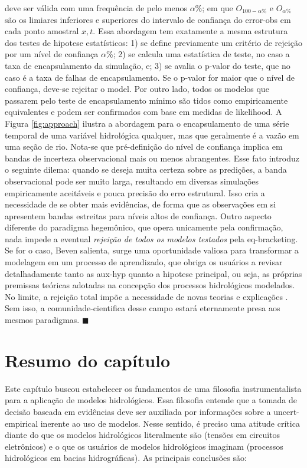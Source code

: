 \documentclass[./main.tex]{subfiles}
\begin{document}
deve ser válida com uma frequência de pelo menos $\alpha\%$; em que $O_{100-\alpha\%}$ e  $O_{\alpha\%}$ são os limiares inferiores e superiores do intervalo de confiança do \gls{error-obs} em cada ponto amostral $x, t$. Essa abordagem tem exatamente a mesma estrutura dos testes de \gls{hipotese} estatísticos: 1) se define previamente um critério de rejeição por um nível de confiança $\alpha$\%; 2) se calcula uma estatística de teste, no caso a taxa de encapsulamento da simulação, e; 3) se avalia o p-valor do teste, que no caso é a taxa de falhas de encapsulamento. Se o p-valor for maior que o nível de confiança, deve-se rejeitar o \gls{model}. Por outro lado, todos os modelos que passarem pelo teste de encapsulamento mínimo são tidos como empiricamente equivalentes e podem ser confirmados com base em medidas de \gls{likelihood}. A Figura \ref{fig:approach} ilustra a abordagem para o encapsulamento de uma série temporal de uma variável hidrológica qualquer, mas que geralmente é a vazão em uma seção de rio. Nota-se que pré-definição do nível de confiança implica em bandas de incerteza observacional mais ou menos abrangentes. Esse fato introduz o seguinte dilema: quando se deseja muita certeza sobre as predições, a banda observacional pode ser muito larga, resultando em diversas simulações empiricamente aceitáveis e pouca precisão do erro estrutural. Isso cria a necessidade de se obter mais evidências, de forma que as observações em si apresentem bandas estreitas para níveis altos de confiança. Outro aspecto diferente do \gls{paradigma} hegemônico, que opera unicamente pela confirmação, nada impede a eventual \textit{rejeição de todos os modelos testados} pela \gls{eq-bracketing}. Se for o caso, Beven salienta, surge uma oportunidade valiosa para transformar a modelagem em um processo de aprendizado, que obriga os usuários a revisar detalhadamente tanto as \gls{aux-hyp} quanto a \gls{hipotese} principal, ou seja, as próprias premissas teóricas adotadas na concepção dos processos hidrológicos modelados. No limite, a rejeição total impõe a necessidade de novas teorias e explicações \cite{Beven2018}. Sem isso, a \gls{comunidade-cientifica} desse campo estará eternamente presa aos mesmos paradigmas. $\blacksquare$

\clearpage

\section{Resumo do capítulo} \label{sec:epis:summary}

\par Este capítulo buscou estabelecer os fundamentos de uma filosofia instrumentalista para a aplicação de modelos hidrológicos. Essa filosofia entende que a tomada de decisão baseada em evidências deve ser auxiliada por informações sobre a \gls{uncert-empirical} inerente ao uso de modelos. Nesse sentido, é preciso uma atitude crítica diante do que os modelos hidrológicos literalmente são (tensões em circuitos eletrônicos) e o que os usuários de modelos hidrológicos imaginam (processos hidrológicos em bacias hidrográficas). As principais conclusões são:
\end{document}
